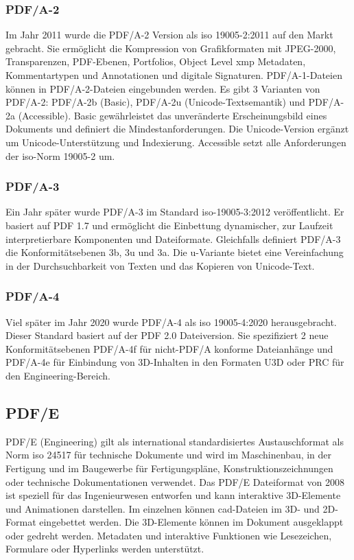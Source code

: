 \subsubsection{PDF/A-2}
Im Jahr 2011 wurde die PDF/A-2 Version als \gls{iso} 19005-2:2011 auf den Markt gebracht. Sie ermöglicht die Kompression von Grafikformaten mit JPEG-2000, Transparenzen, PDF-Ebenen, Portfolios, Object Level \gls{xmp} Metadaten, Kommentartypen und Annotationen und digitale Signaturen. \cite{proj-consult} PDF/A-1-Dateien können in PDF/A-2-Dateien eingebunden werden. Es gibt 3 Varianten von PDF/A-2: PDF/A-2b (Basic), PDF/A-2u (Unicode-Textsemantik) und PDF/A-2a (Accessible). Basic gewährleistet das unveränderte Erscheinungsbild eines Dokuments und definiert die Mindestanforderungen. Die Unicode-Version ergänzt um Unicode-Unterstützung und Indexierung. Accessible setzt alle Anforderungen der \gls{iso}-Norm 19005-2 um. \cite{adobe-pdf-a}

\subsubsection{PDF/A-3}
Ein Jahr später wurde PDF/A-3 im Standard \gls{iso}-19005-3:2012 veröffentlicht. Er basiert auf PDF 1.7 und ermöglicht die Einbettung dynamischer, zur Laufzeit interpretierbare Komponenten und Dateiformate. Gleichfalls definiert PDF/A-3 die Konformitätsebenen 3b, 3u und 3a. Die u-Variante bietet eine Vereinfachung in der Durchsuchbarkeit von Texten und das Kopieren von Unicode-Text. \cite{proj-consult}

\subsubsection{PDF/A-4}
Viel später im Jahr 2020 wurde PDF/A-4 als \gls{iso} 19005-4:2020 herausgebracht. Dieser Standard basiert auf der PDF 2.0 Dateiversion. Sie spezifiziert 2 neue Konformitätsebenen PDF/A-4f für nicht-PDF/A konforme Dateianhänge und PDF/A-4e für Einbindung von 3D-Inhalten in den Formaten U3D oder PRC für den Engineering-Bereich. \cite{proj-consult}


\subsection{PDF/E}
PDF/E (Engineering) gilt als international standardisiertes Austauschformat als Norm \gls{iso} 24517 für technische Dokumente und wird im Maschinenbau, in der Fertigung und im Baugewerbe für Fertigungspläne, Konstruktionszeichnungen oder technische Dokumentationen verwendet. Das PDF/E Dateiformat von 2008 ist speziell für das Ingenieurwesen entworfen und kann interaktive 3D-Elemente und Animationen darstellen. Im einzelnen können \gls{cad}-Dateien im 3D- und 2D-Format eingebettet werden. Die 3D-Elemente können im Dokument ausgeklappt oder gedreht werden. Metadaten und interaktive Funktionen wie Lesezeichen, Formulare oder Hyperlinks werden unterstützt. \cite{adobe-pdf-e}


